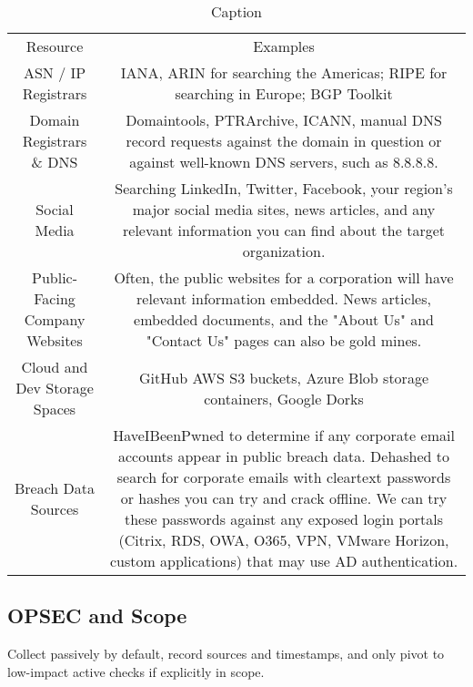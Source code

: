 \begin{table}
    \centering
    \begin{tabular}{cc}
         Resource& Examples\\
         ASN / IP Registrars& IANA, ARIN for searching the Americas; RIPE for searching in Europe; BGP Toolkit\\
         Domain Registrars \& DNS& Domaintools, PTRArchive, ICANN, manual DNS record requests against the domain in question or against well-known DNS servers, such as 8.8.8.8.\\
         Social Media& Searching LinkedIn, Twitter, Facebook, your region's major social media sites, news articles, and any relevant information you can find about the target organization.\\
         Public-Facing Company Websites& Often, the public websites for a corporation will have relevant information embedded. News articles, embedded documents, and the "About Us" and "Contact Us" pages can also be gold mines.\\
         Cloud and Dev Storage Spaces& GitHub AWS S3 buckets, Azure Blob storage containers, Google Dorks\\
         Breach Data Sources& HaveIBeenPwned to determine if any corporate email accounts appear in public breach data. Dehashed to search for corporate emails with cleartext passwords or hashes you can try and crack offline. We can try these passwords against any exposed login portals (Citrix, RDS, OWA, O365, VPN, VMware Horizon, custom applications) that may use AD authentication.\\
    \end{tabular}
    \caption{Caption}
    \label{tab:placeholder}
\end{table}
\subsection{OPSEC and Scope}
Collect passively by default, record sources and timestamps, and only pivot to low-impact active checks if explicitly in scope.